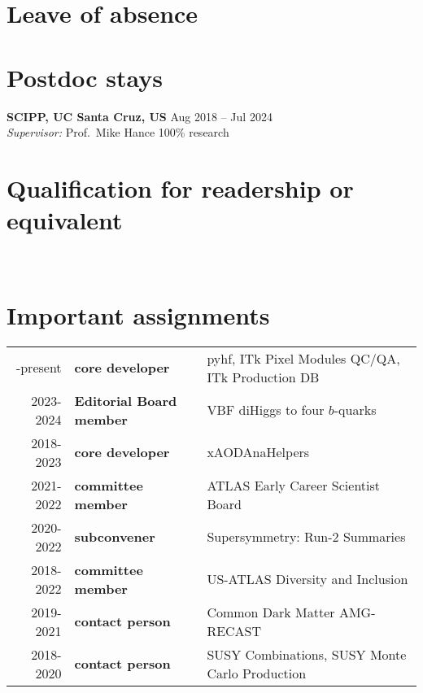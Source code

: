 \vspace{-2.5em}\section{Leave of absence \none}

\vspace{-0.0em}\section{Postdoc stays}
\textbf{SCIPP, UC Santa Cruz, US} \hfill Aug 2018 -- Jul 2024 \\
\textsl{Supervisor:} Prof.~Mike Hance \hfill 100\% research

\vspace{-2.0em}\section{Qualification for readership or equivalent \noneyet}
\, \\

\vspace{-4.5em}\section{Important assignments}
{
  \footnotesize
  \begin{tabular}{r|>{\bfseries}ll}
    \centering
    2018-present & core developer & pyhf, ITk Pixel Modules QC/QA, ITk Production DB\\
    2023-2024 & Editorial Board member & VBF diHiggs to four $b$-quarks \\
    2018-2023 & core developer & xAODAnaHelpers \\
    2021-2022 & committee member & ATLAS Early Career Scientist Board \\
    2020-2022 & subconvener & Supersymmetry: Run-2 Summaries \\
    2018-2022 & committee member & US-ATLAS Diversity and Inclusion \\
    2019-2021 & contact person & Common Dark Matter AMG-RECAST \\
    2018-2020 & contact person & SUSY Combinations, SUSY Monte Carlo Production \\
  \end{tabular}
}



